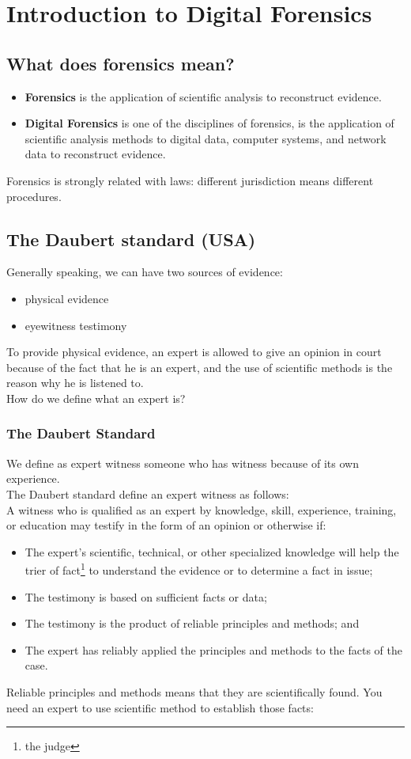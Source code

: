 \chapter{Introduction to Digital Forensics}
\section{What does forensics mean?}
    \begin{itemize}
        \item \textbf{Forensics} is the application of scientific analysis to reconstruct evidence.
        \item \textbf{Digital Forensics} is one of the disciplines of forensics, is the application of scientific analysis methods to digital data, computer systems, and network data to reconstruct evidence.
    \end{itemize}
    Forensics is strongly related with laws: different jurisdiction means different procedures.
\section{The Daubert standard (USA)}
    Generally speaking, we can have two sources of evidence:
    \begin{itemize}
        \item physical evidence
        \item eyewitness testimony
    \end{itemize}
    To provide physical evidence, an expert is allowed to give an opinion in court because of the fact that he is an expert, and the use of scientific methods is the reason why he is listened to.\\
    How do we define what an expert is?
    \subsection{The Daubert Standard}
        We define as expert witness someone who has witness because of its own experience.\\
        The Daubert standard define an expert witness as follows:\\
        A witness who is qualified as an expert by knowledge, skill, experience, training, or education may testify in the form of an opinion or otherwise if:
        \begin{itemize}
            \item The expert's scientific, technical, or other specialized knowledge will help the trier of fact\footnote{the judge} to understand the evidence or to determine a fact in issue;
            \item The testimony is based on sufficient facts or data;
            \item The testimony is the product of reliable principles and methods; and
            \item The expert has reliably applied the principles and methods to the facts of the case.
        \end{itemize}
    Reliable principles and methods means that they are scientifically found. You need an expert to use scientific method to establish those facts:
